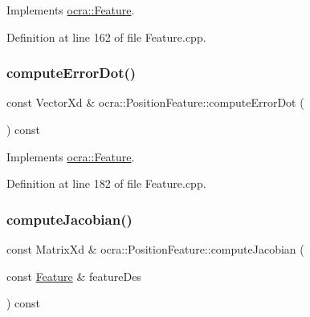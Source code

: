 Implements \hyperlink{classocra_1_1Feature_ac714181e1bb25f878349e299c4ba8c00}{ocra\+::\+Feature}.



Definition at line 162 of file Feature.\+cpp.

\hypertarget{classocra_1_1PositionFeature_a3bf7b70beb60e5e2a4975a157f7b6c19}{}\label{classocra_1_1PositionFeature_a3bf7b70beb60e5e2a4975a157f7b6c19} 
\subsubsection{\texorpdfstring{compute\+Error\+Dot()}{computeErrorDot()}\hspace{0.1cm}{\footnotesize\ttfamily [2/2]}}
{\footnotesize\ttfamily const Vector\+Xd \& ocra\+::\+Position\+Feature\+::compute\+Error\+Dot (\begin{DoxyParamCaption}{ }\end{DoxyParamCaption}) const\hspace{0.3cm}{\ttfamily [virtual]}}



Implements \hyperlink{classocra_1_1Feature_a01a4870418ba87d5b41d8f917c1255fc}{ocra\+::\+Feature}.



Definition at line 182 of file Feature.\+cpp.

\hypertarget{classocra_1_1PositionFeature_a9e609b86dcc917313b34853547738ca5}{}\label{classocra_1_1PositionFeature_a9e609b86dcc917313b34853547738ca5} 
\subsubsection{\texorpdfstring{compute\+Jacobian()}{computeJacobian()}\hspace{0.1cm}{\footnotesize\ttfamily [1/2]}}
{\footnotesize\ttfamily const Matrix\+Xd \& ocra\+::\+Position\+Feature\+::compute\+Jacobian (\begin{DoxyParamCaption}\item[{const \hyperlink{classocra_1_1Feature}{Feature} \&}]{feature\+Des }\end{DoxyParamCaption}) const\hspace{0.3cm}{\ttfamily [virtual]}}



